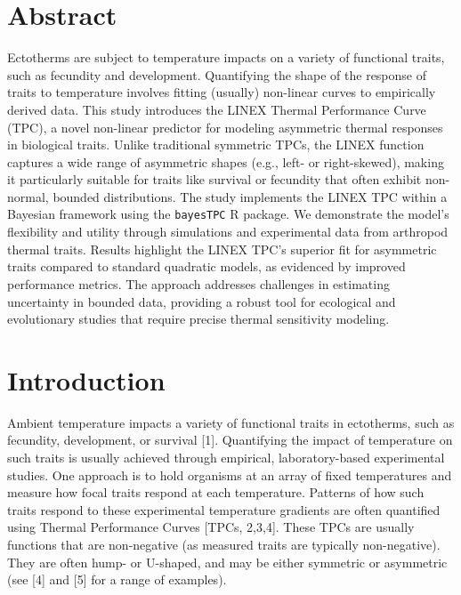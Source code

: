 \documentclass[
  11pt,
  letterpaper,
]{article}
\begin{document}
\section*{Abstract}
Ectotherms are subject to temperature impacts on a variety of functional
traits, such as fecundity and development. Quantifying the shape of the
response of traits to temperature involves fitting (usually) non-linear
curves to empirically derived data. This study introduces the LINEX
Thermal Performance Curve (TPC), a novel non-linear predictor for
modeling asymmetric thermal responses in biological traits. Unlike
traditional symmetric TPCs, the LINEX function captures a wide range of
asymmetric shapes (e.g., left- or right-skewed), making it particularly
suitable for traits like survival or fecundity that often exhibit
non-normal, bounded distributions. The study implements the LINEX TPC
within a Bayesian framework using the \texttt{bayesTPC} R package. We
demonstrate the model's flexibility and utility through simulations and
experimental data from arthropod thermal traits. Results highlight the
LINEX TPC's superior fit for asymmetric traits compared to standard
quadratic models, as evidenced by improved performance metrics. The
approach addresses challenges in estimating uncertainty in bounded data,
providing a robust tool for ecological and evolutionary studies that
require precise thermal sensitivity modeling.

\linenumbers

\section{Introduction}\label{introduction}

Ambient temperature impacts a variety of functional traits in
ectotherms, such as fecundity, development, or survival {[}1{]}.
Quantifying the impact of temperature on such traits is usually achieved
through empirical, laboratory-based experimental studies. One approach
is to hold organisms at an array of fixed temperatures and measure how
focal traits respond at each temperature. Patterns of how such traits
respond to these experimental temperature gradients are often quantified
using Thermal Performance Curves {[}TPCs, 2,3,4{]}. These TPCs are
usually functions that are non-negative (as measured traits are
typically non-negative). They are often hump- or U-shaped, and may be
either symmetric or asymmetric (see {[}4{]} and {[}5{]} for a range of
examples).
\end{document}
